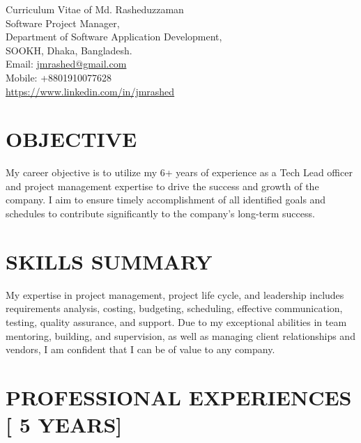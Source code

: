 \documentclass[10pt]{res}
\date{\displaydate{date}}
\begin{document}
 



  
{\huge Curriculum Vitae of } 
{\huge Md. Rasheduzzaman} \\
 Software Project Manager, \\
 Department of Software Application Development,\\
 SOOKH, Dhaka, Bangladesh.\\
 Email:  \href{mailto:jmrashed@gmail.com}{jmrashed@gmail.com} \\
 Mobile:  +8801910077628 \\
\href{https://www.linkedin.com/in/jmrashed}{https://www.linkedin.com/in/jmrashed} \\

 

\begin{resume}

 

\section{OBJECTIVE}

\vspace{7pt}  
My career objective is to utilize my 6+ years of experience as a Tech Lead officer and project management expertise to drive the success and growth of the company. I aim to ensure timely accomplishment of all identified goals and schedules to contribute significantly to the company's long-term success.


\section{SKILLS SUMMARY}

\vspace{7pt}  
My expertise in project management, project life cycle, and leadership includes requirements analysis, costing, budgeting, scheduling, effective communication, testing, quality assurance, and support. Due to my exceptional abilities in team mentoring, building, and supervision, as well as managing client relationships and vendors, I am confident that I can be of value to any company.

\vspace{7pt} 


 
\section{PROFESSIONAL EXPERIENCES [ 5 YEARS]} 
 

\end{resume}
\end{document}
